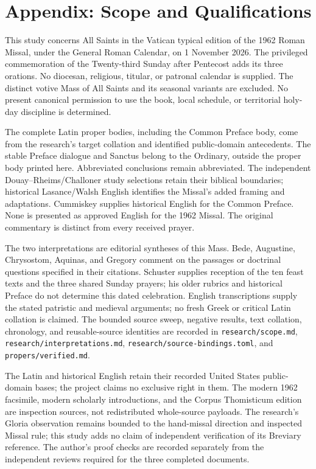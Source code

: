 \section{Appendix: Scope and Qualifications}
This study concerns All Saints in the Vatican typical edition of the
1962 Roman Missal, under the General Roman Calendar, on 1 November 2026.
The privileged commemoration of the Twenty-third Sunday after Pentecost
adds its three orations. No diocesan, religious, titular, or patronal
calendar is supplied. The distinct votive Mass of All Saints and its
seasonal variants are excluded. No present canonical permission to use
the book, local schedule, or territorial holy-day discipline is determined.

The complete Latin proper bodies, including the Common Preface body,
come from the research's target collation and identified public-domain
antecedents. The stable Preface dialogue and Sanctus belong to the
Ordinary, outside the proper body printed here. Abbreviated conclusions
remain abbreviated. The independent Douay--Rheims/Challoner study
selections retain their biblical boundaries; historical Lasance/Walsh
English identifies the Missal's added framing and adaptations.
Cummiskey supplies historical English for the Common Preface. None is
presented as approved English for the 1962 Missal. The original
commentary is distinct from every received prayer.

The two interpretations are editorial syntheses of this Mass. Bede,
Augustine, Chrysostom, Aquinas, and Gregory comment on the passages or
doctrinal questions specified in their citations. Schuster supplies
reception of the ten feast texts and the three shared Sunday prayers;
his older rubrics and historical Preface do not determine this dated
celebration. English transcriptions supply the stated patristic and
medieval arguments; no fresh Greek or critical Latin collation is claimed.
The bounded source sweep, negative results, text collation, chronology,
and reusable-source identities are recorded in \texttt{research/scope.md},
\texttt{research/interpretations.md}, \texttt{research/source-bindings.toml},
and \texttt{propers/verified.md}.

The Latin and historical English retain their recorded United States
public-domain bases; the project claims no exclusive right in them.
The modern 1962 facsimile, modern scholarly introductions, and the
Corpus Thomisticum edition are inspection sources, not redistributed
whole-source payloads. The research's Gloria observation remains bounded
to the hand-missal direction and inspected Missal rule; this study adds
no claim of independent verification of its Breviary reference.
The author's proof checks are recorded separately from the independent
reviews required for the three completed documents.


